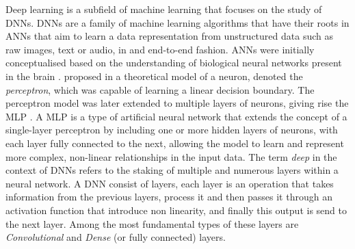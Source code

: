 Deep learning is a subfield of machine learning that focuses on the study of
\acp{DNN}. \acp{DNN} are a family of machine learning algorithms that have their
roots in \acp{ANN} that aim to learn a data representation from unstructured
data such as raw images, text or audio, in and end-to-end fashion. \acp{ANN}
were initially conceptualised based on the understanding of biological neural
networks present in the brain \cite{mcculloch1943logical,hebb2005organization}.
\citeauthor{rosenblatt1958perceptron} proposed in
\cite{rosenblatt1958perceptron} a theoretical model of a neuron, denoted the
\emph{perceptron}, which was capable of learning a linear decision boundary. The
perceptron model was later extended to multiple layers of neurons, giving rise
the \ac{MLP} \cite{rosenblatt1961principles,rumelhart1986learning}. A \acl{MLP}
is a type of artificial neural network that extends the concept of a
single-layer perceptron by including one or more hidden layers of neurons, with
each layer fully connected to the next, allowing the model to learn and
represent more complex, non-linear relationships in the input data. The term
\emph{deep} in the context of \acp{DNN} refers to the staking of multiple and
numerous layers within a neural network. A \ac{DNN} consist of layers, each
layer is an operation that takes information from the previous layers, process
it and then passes it through an activation function
\cite{glorot2011deep,DBLP:journals/pieee/LeCunBBH98,klambauer2017self} that
introduce non linearity, and finally this output is send to the next layer.
Among the most fundamental types of these layers are \emph{Convolutional} and
\emph{Dense} (or fully connected) layers. \\

